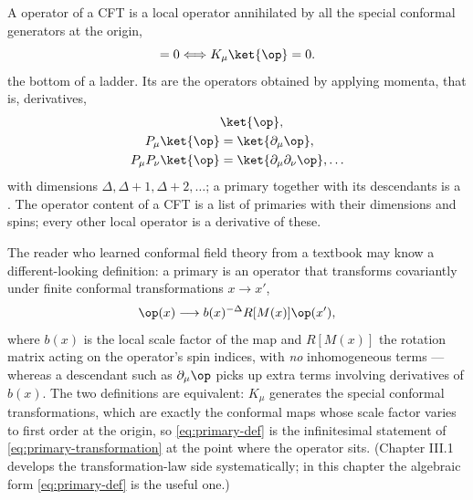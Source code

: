 \begin{ddefinition}
\label{def:primary}
A  operator of a CFT is a local operator annihilated by all
the special conformal generators at the origin,
\begin{equation}
[K_\mu, \op(0)] = 0
\Longleftrightarrow
K_\mu \ket{\op} = 0.
\label{eq:primary-def}
\end{equation}
the bottom of a ladder. Its  are the operators obtained
by applying momenta, that is, derivatives,
\begin{equation}
\begin{aligned}
&\ket{\op},\\
P_\mu \ket{\op} &= \ket{\partial_\mu \op},\\
P_\mu P_\nu \ket{\op} &= \ket{\partial_\mu \partial_\nu \op}, \dots
\end{aligned}
\end{equation}
with dimensions $\Delta, \Delta + 1, \Delta + 2, \dots$; a primary together
with its descendants is a . The operator content
of a CFT is a list of primaries with their dimensions and spins; every
other local operator is a derivative of these.
\end{ddefinition}

\noin The reader who learned conformal field theory from a textbook may know
a different-looking definition: a primary is an operator that transforms
covariantly under finite conformal transformations $x \to x'$,
\begin{equation}
\op(x) \longrightarrow b(x)^{-\Delta} R[M(x)] \op(x'),
\label{eq:primary-transformation}
\end{equation}
where $b(x)$ is the local scale factor of the map and $R[M(x)]$ the rotation
matrix acting on the operator's spin indices, with \emph{no} inhomogeneous
terms --- whereas a descendant such as $\partial_\mu \op$ picks up extra
terms involving derivatives of $b(x)$. The two definitions are equivalent:
$K_\mu$ generates the special conformal transformations, which are exactly
the conformal maps whose scale factor varies to first order at the origin,
so \eqref{eq:primary-def} is the infinitesimal statement of
\eqref{eq:primary-transformation} at the point where the operator sits.
(Chapter III.1 develops the transformation-law side systematically; in this
chapter the algebraic form \eqref{eq:primary-def} is the useful one.)

